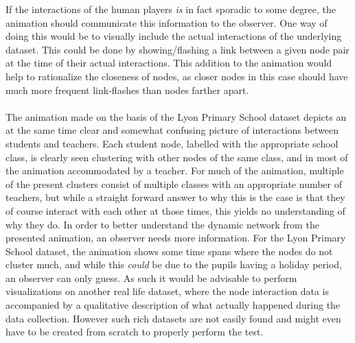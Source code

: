 If the interactions of the human players \textit{is} in fact sporadic to some degree, the animation should communicate this information to the observer.
One way of doing this would be to visually include the actual interactions of the underlying dataset.
This could be done by showing/flashing a link between a given node pair at the time of their actual interactions.
This addition to the animation would help to rationalize the closeness of nodes, as closer nodes in this case should have much more frequent link-flashes than nodes farther apart.
\\\\
The animation made on the basis of the Lyon Primary School dataset depicts an at the same time clear and somewhat confusing picture of interactions between students and teachers.
Each student node, labelled with the appropriate school class, is clearly seen clustering with other nodes of the same class, and in most of the animation accommodated by a teacher.
For much of the animation, multiple of the present clusters consist of multiple classes with an appropriate number of teachers, but while a straight forward answer to why this is the case is that they of course interact with each other at those times, this yields no understanding of why they do.
In order to better understand the dynamic network from the presented animation, an observer needs more information.
For the Lyon Primary School dataset, the animation shows some time spans where the nodes do not cluster much, and while this \textit{could} be due to the pupils having a holiday period, an observer can only guess. As such it would be advisable to perform visualizations on another real life dataset, where the node interaction data is accompanied by a qualitative description of what actually happened during the data collection. However such rich datasets are not easily found and might even have to be created from scratch to properly perform the test.







